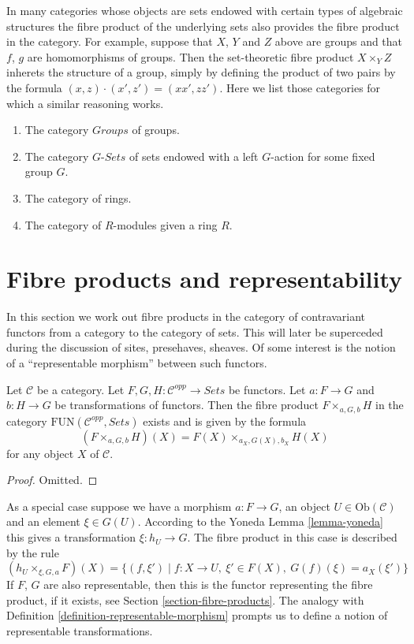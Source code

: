 \medskip\noindent
In many categories whose objects are sets endowed with certain types of
algebraic structures the fibre product of the underlying sets also
provides the fibre product in the category. For example, suppose
that $X$, $Y$ and $Z$ above are groups and that $f$, $g$ are
homomorphisms of groups. Then the set-theoretic fibre product
$X\times_Y Z$ inherets the structure of a group, simply by
defining the product of two pairs by the formula
$(x,z) \cdot (x',z') = (xx', zz')$. Here we list those categories
for which a similar reasoning works.
\begin{enumerate}
\item The category $\textit{Groups}$ of groups.
\item The category $G\textit{-Sets}$ of sets
endowed with a left $G$-action for some fixed group $G$.
\item The category of rings.
\item The category of $R$-modules given a ring $R$.
\end{enumerate}




\section{Fibre products and representability}
\label{section-representable-map-presheaves}

\noindent
In this section we work out fibre products in the
category of contravariant functors from a category
to the category of sets. This will later be superceded
during the discussion of sites, presehaves, sheaves. Of some
interest is the notion of a ``representable morphism'' between
such functors.

\begin{lemma}
\label{lemma-fibre-product-presheaves}
Let $\mathcal{C}$ be a category.
Let $F, G, H : \mathcal{C}^{opp} \to \textit{Sets}$
be functors. Let $a : F \to G$ and $b : H \to G$ be
transformations of functors. Then the fibre product
$F \times_{a, G, b} H$ in the category
$\text{FUN}(\mathcal{C}^{opp}, \textit{Sets})$
exists and is given by the formula
$$
(F \times_{a, G, b} H)(X) = 
F(X) \times_{a_X, G(X), b_X} H(X)
$$
for any object $X$ of $\mathcal{C}$.
\end{lemma}

\begin{proof}
Omitted.
\end{proof}

\noindent
As a special case suppose we have a morphism
$a : F \to G$, an object $U \in \text{Ob}(\mathcal{C})$
and an element $\xi \in G(U)$. According to the Yoneda 
Lemma \ref{lemma-yoneda} this gives a transformation
$\xi : h_U \to G$. The fibre product in this case
is described by the rule
$$
(h_U \times_{\xi, G, a} F)(X) =
\{ (f, \xi') \mid f : X \to U,\ \xi' \in F(X),\ G(f)(\xi) = a_X(\xi')\}
$$
If $F$, $G$ are also representable, then this is the functor representing the
fibre product, if it exists, see Section \ref{section-fibre-products}.
The analogy with Definition \ref{definition-representable-morphism}
prompts us to define a notion
of representable transformations.

